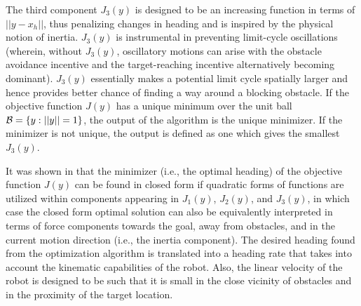 \documentclass[10pt,conference]{ieeeconf}
\begin{document}
The third component $J_3(y)$ is designed to be an increasing function in terms of
$||y-x_h||$, thus penalizing
changes in heading and is
inspired by the physical notion of inertia. $J_3(y)$ is instrumental in
    preventing limit-cycle oscillations (wherein, without $J_3(y)$, oscillatory motions can arise with the obstacle avoidance incentive and the target-reaching incentive alternatively becoming dominant).  $J_3(y)$
    essentially makes a potential limit cycle spatially larger and
    hence provides better chance of finding a way around a blocking obstacle.  
If the objective function $J(y)$ has a unique minimum over the unit ball ${\cal B}=\{y:||y||=1\}$,
 the output of the algorithm
is the unique minimizer.  If the minimizer is not unique, the output
is defined as one which gives the smallest $J_3(y)$.   

It was shown in \cite{KK05b_jirs} that the 
minimizer (i.e., the optimal heading) of the objective function $J(y)$ can be
found in closed form if quadratic forms of functions are utilized within
components appearing in $J_1(y)$, $J_2(y)$, and $J_3(y)$, in which case the
 closed form optimal solution can also be equivalently interpreted in terms of force components towards
 the goal, away from obstacles, and in the current motion direction (i.e., the
 inertia component).
The desired heading found from the optimization algorithm is translated into a heading rate
that takes into account the kinematic capabilities of the robot.  
Also, 
the linear velocity of the robot is designed to be such that it is small in the close
vicinity of obstacles and in the proximity of the target location.  
\end{document}
